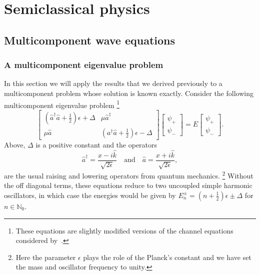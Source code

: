 
\chapter{Semiclassical physics}

\section{Multicomponent wave equations}

\subsection{A multicomponent eigenvalue problem}

In this section we will apply the results that we derived previously to a multicomponent problem whose solution is known exactly.
Consider the following multicomponent eigenvalue problem%
\footnote{These equations are slightly modified versions of the channel equations considered by~\citet{yabana1986}.}
%
\begin{equation}
  \begin{bmatrix}
    \left(\hat{a}^{\dagger}\hat{a} + \frac{1}{2}\right)\epsilon + \Delta & \mu\hat{a}^{\dagger}\\
    \mu\hat{a} & \left(a^{\dagger}\hat{a} + \frac{1}{2}\right)\epsilon - \Delta
  \end{bmatrix}
  \begin{bmatrix}
    \psi_{+}\\
    \psi_{-}
  \end{bmatrix}
  =
  E
  \begin{bmatrix}
    \psi_{+}\\
    \psi_{-}
  \end{bmatrix}.
\end{equation}
%
Above, $\Delta$ is a positive constant and the operators
%
\begin{equation}
\hat{a}^{\dagger} = \frac{x - i\hat{k}}{\sqrt{2\epsilon}}
  \quad\text{and}\quad
\hat{a} = \frac{x + i\hat{k}}{\sqrt{2\epsilon}},
\end{equation}
%
are the usual raising and lowering operators from quantum mechanics.%
\footnote{Here the parameter $\epsilon$ plays the role of the Planck's constant and we have set the mass and oscillator frequency to unity.}
Without the off diagonal terms, these equations reduce to two uncoupled simple harmonic oscillators, in which case the energies would be given by $E_{n}^{\pm} = (n + \frac{1}{2})\epsilon \pm \Delta$ for $n \in \mathbb{N}_{0}$.
